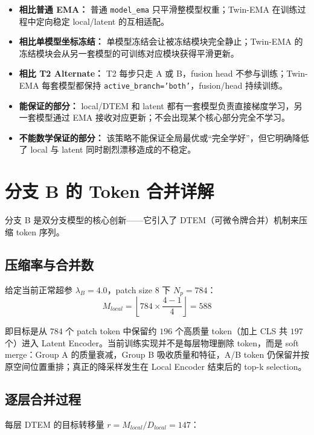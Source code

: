 \documentclass[a4paper,11pt]{article}
\begin{document}
\begin{itemize}
    \item \textbf{相比普通 EMA：} 普通 \texttt{model\_ema} 只平滑整模型权重；Twin-EMA 在训练过程中定向稳定 local/latent 的互相适配。
    \item \textbf{相比单模型坐标冻结：} 单模型冻结会让被冻结模块完全静止；Twin-EMA 的冻结模块会从另一套模型的可训练对应模块获得平滑更新。
    \item \textbf{相比 T2 Alternate：} T2 每步只走 A 或 B，fusion head 不参与训练；Twin-EMA 每套模型都保持 \texttt{active\_branch='both'}，fusion/head 持续训练。
    \item \textbf{能保证的部分：} local/DTEM 和 latent 都有一套模型负责直接梯度学习，另一套模型通过 EMA 接收对应更新；不会出现某个核心部分完全不学习。
    \item \textbf{不能数学保证的部分：} 该策略不能保证全局最优或“完全学好”，但它明确降低了 local 与 latent 同时剧烈漂移造成的不稳定。
\end{itemize}

\section{分支 B 的 Token 合并详解}

分支 B 是双分支模型的核心创新——它引入了 DTEM（可微令牌合并）机制来压缩 token 序列。

\subsection{压缩率与合并数}

给定当前正常超参 $\lambda_B = 4.0$，patch size $8$ 下 $N_p = 784$：
\[
    M_{local} = \left\lfloor 784 \times \frac{4-1}{4} \right\rfloor = 588
\]

即目标是从 $784$ 个 patch token 中保留约 $196$ 个高质量 token（加上 CLS 共 $197$ 个）进入 Latent Encoder。当前训练实现并不是每层物理删除 token，而是 soft merge：Group A 的质量衰减，Group B 吸收质量和特征，A/B token 仍保留并按原空间位置重排；真正的降采样发生在 Local Encoder 结束后的 top-k selection。

\subsection{逐层合并过程}

每层 DTEM 的目标转移量 $r = M_{local} / D_{local} = 147$：
\end{document}
